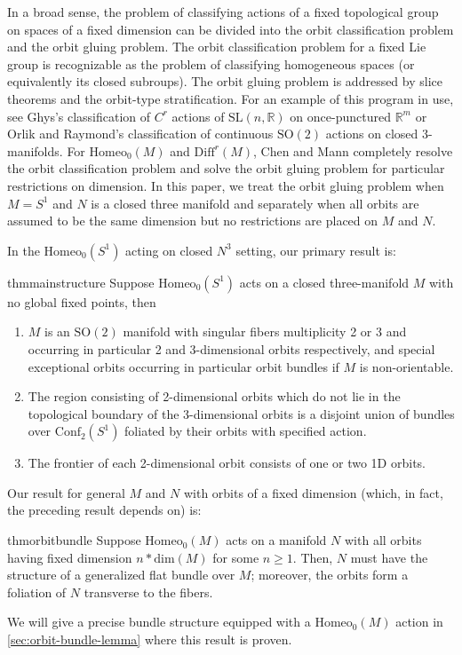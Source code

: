 \documentclass[10pt, oneside]{article}
\newcommand{\R}{\mathbb{R}}
\newcommand{\SO}[1][2]{\text{SO}(#1)}
\newcommand{\homeo}[1][S^1]{\text{Homeo}_0(#1)}
\newcommand{\diffr}[1][M]{\text{Diff}^r(#1)}
\newcommand{\conf}[2][S^1]{\text{Conf}_{#2}(#1)}
\newcommand{\SL}[1][2]{\text{SL}(#1, \R)}
\newcommand{\dimn}[1]{\text{dim}(#1)}
\theoremstyle{definition}
\theoremstyle{definition}
\begin{document}
In a broad sense, the problem of classifying actions of a fixed topological group on spaces of a fixed dimension can be divided into the orbit classification problem and the orbit gluing problem. The orbit classification problem for a fixed Lie group is recognizable as the problem of classifying homogeneous spaces (or equivalently its closed subroups). The orbit gluing problem is addressed by slice theorems and the orbit-type stratification. For an example of this program in use, see Ghys's classification of $C^r$ actions of $\SL[n]$ on once-punctured $\R^m$\cite{cairns:LocalLinearization} or Orlik and Raymond's classification of continuous $\SO$ actions on closed 3-manifolds\cite{orlik:ActionsSO2}. For $\homeo[M]$ and $\diffr$, Chen and Mann completely resolve the orbit classification problem and solve the orbit gluing problem for particular restrictions on dimension. In this paper, we treat the orbit gluing problem when $M= S^1$ and $N$ is a closed three manifold and separately when all orbits are assumed to be the same dimension but no restrictions are placed on $M$ and $N$.

In the $\homeo[S^1]$ acting on closed $N^3$ setting, our primary result is:
\begin{restatable}{thm}{mainstructure}
\label{thm:main-structure-thm}
        Suppose $\homeo$ acts on a  closed three-manifold $M$ with no global fixed points, then
        \begin{enumerate}
            \item $M$ is an $\SO$ manifold with singular fibers multiplicity 2 or 3 and occurring in particular 2 and 3-dimensional orbits respectively, and special exceptional orbits occurring in particular orbit bundles if $M$ is non-orientable.
            \item The region consisting of 2-dimensional orbits which do not lie in the topological boundary of the 3-dimensional orbits is a disjoint union of bundles over $\conf[S^1]{2}$ foliated by their orbits with specified action.
            \item The frontier of each 2-dimensional orbit consists of one or two 1D orbits.
        \end{enumerate}
\end{restatable}
Our result for general $M$ and $N$ with orbits of a fixed dimension (which, in fact, the preceding result depends on) is:
\begin{restatable}{thm}{orbitbundle}
\label{thm:orbit-bundle}
    Suppose $\homeo[M]$ acts on a manifold $N$ with all orbits having fixed dimension $n*\dimn{M}$ for some $n\geq 1$. Then, $N$ must have the structure of a generalized flat bundle over $M$; moreover, the orbits form a foliation of $N$ transverse to the fibers.
\end{restatable}
We will give a precise bundle structure equipped with a $\homeo[M]$ action in \cref{sec:orbit-bundle-lemma} where this result is proven.
\end{document}
